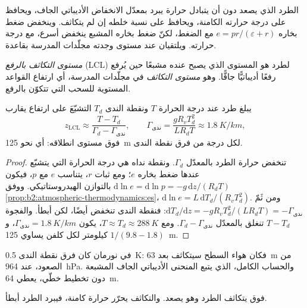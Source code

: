 الطرد الذي يصعد دون أن يتبادل حرارة يبرد بمعدّل الانخفاض الأديباتي الجاف، ويحافظ على
درجة حرارته الكامنة، ويحافظ على نسبة خلطه إن لم يتكاثف. وينخفض ضغط بخاره
$e = pr/(\varepsilon + r)$ مع الضغط، لكنّ ضغط بخاره المشبع ينخفض
أسرع، مع درجة حرارته. ويلتقيان عند مستوى وجدته مجلّدات المدرسة بقاعدة.

\begin{definition}\label{def:b2:atmospheric-thermodynamics:lcl}
\emph{مستوى التكاثف بالرفع} (LCL) لطرد هو
المستوى الذي يصبح عنده مشبعًا حين يُرفع رفعًا أديباتيًّا جافًّا. وهو
\emph{مستوى التكاثف} في مجلّدات المدرسة، أي ارتفاع
القواعد المستوية للسحب التي تتكوّن بالرفع.
\end{definition}

\begin{proposition}\label{prop:b2:atmospheric-thermodynamics:lcl}
يبلغ طرد عند درجة الحرارة $T$ ونقطة الندى $T_d$ التشبّعَ على ارتفاع يقارب
\[
  z_{\text{LCL}} \approx \frac{T - T_d}{\Gamma_d - \Gamma_{\text{ندى}}}, \qquad
  \Gamma_{\text{ندى}} = \frac{g R_v T_d^2}{L R_d T} \approx \qty{1.8}{K/km},
\]
فوق مستوى انطلاقه: أي نحو \qty{125}{m} لكل درجة من فرق نقطة الندى.
\end{proposition}

\begin{proof}
تنخفض حرارة الطرد بالمعدّل $\Gamma_d$. ونقطة نداه هي درجة الحرارة التي يتشبّع عندها
ضغط بخاره $e$؛ ومع ثبات $r$، يتناسب $e$ مع $p$، فيكون
$\mathrm{d}\ln e = \mathrm{d}\ln p = -g\,\mathrm{d}z/(R_dT)$ بالتوازن الهيدروستاتيكي. ووفق
\cref{prop:b2:atmospheric-thermodynamics:es}، $\mathrm{d}\ln e = L\,\mathrm{d}T_d/(R_vT_d^2)$.
ومن ثَمّ $\mathrm{d}T_d/\mathrm{d}z = -gR_vT_d^2/(LR_dT) = -\Gamma_{\text{ندى}}$: فنقطة الندى تنخفض
أيضًا، لكن أبطأ. والفجوة $T - T_d$ تنغلق بالمعدّل $\Gamma_d - \Gamma_{\text{ندى}}$. ومع
$T \approx T_d \approx \qty{288}{K}$، يكون $\Gamma_{\text{ندى}} = \qty{1.8}{K/km}$، و$1/(9.8 - 1.8)$
كيلومتر لكل كلفن يساوي \qty{125}{m}.
\end{proof}

في نورمان كان فرق نقطة الندى \qty{0.5}{K}: فكان هواء السطح سيتكاثف بعد
\qty{63}{m} من الصعود، عند \qty{964}{hPa}. والحساب الكامل، الذي يتبع المنحنى الأديباتي الجاف
 المشبعة دون تخطيط خطّي، يعطي \qty{64}{m}.

فوق  يتكاثف الطرد وهو يصعد. والتكاثف يحرّر حرارة كامنة، فيبرد
الطرد أبطأ.

